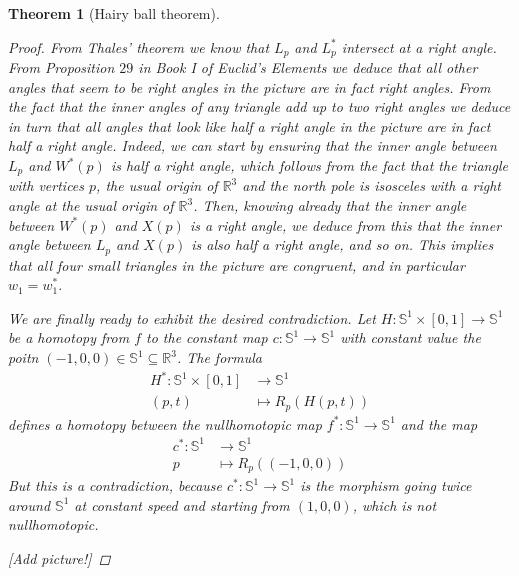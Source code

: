 \documentclass[A4paper, 12pt, british, reqno]{amsart}
\newcommand{\R}{\mathbb{R}} %
\newcommand{\bbS}{\mathbb{S}}
\theoremstyle{plain}
\newtheorem{thm}{Theorem}[section]
\theoremstyle{definition}
\theoremstyle{remark}
\theoremstyle{plain}
\theoremstyle{definition}
\theoremstyle{remark}
\theoremstyle{plain}
\theoremstyle{definition}
\theoremstyle{remark}
\begin{document}
\begin{thm}[Hairy ball theorem]
\begin{proof}
	From Thales' theorem we know that $L_{p}$ and $L^{*}_{p}$ intersect at a right angle.
	From Proposition $29$ in Book I of Euclid's \textit{Elements} we deduce that all other angles that seem to be right angles in the picture are in fact right angles.
	From the fact that the inner angles of any triangle add up to two right angles we deduce in turn that all angles that look like half a right angle in the picture are in fact half a right angle.
	Indeed, we can start by ensuring that the inner angle between $L_{p}$ and $W^{*}(p)$ is half a right angle, which follows from the fact that the triangle with vertices $p$, the usual origin of $\R^{3}$ and the north pole is isosceles with a right angle at the usual origin of $\R^{3}$.
	Then, knowing already that the inner angle between $W^{*}(p)$ and $X(p)$ is a right angle, we deduce from this that the inner angle between $L_{p}$ and $X(p)$ is also half a right angle, and so on.
	This implies that all four small triangles in the picture are congruent, and in particular $w_{1}=w_{1}^{*}$.

	We are finally ready to exhibit the desired contradiction.
	Let $H\colon \bbS^{1}\times [0,1]\to \bbS^{1}$ be a homotopy from $f$ to the constant map $c\colon \bbS^{1}\to \bbS^{1}$ with constant value the poitn $(-1,0,0)\in \bbS^{1}\subseteq \R^{3}$.
	The formula
	\begin{align*}
	    H^{*}\colon \bbS^{1}\times [0,1] & \longrightarrow \bbS^{1} \\
	    (p,t) & \longmapsto R_{p}(H(p,t))
	\end{align*}
	defines a homotopy between the nullhomotopic map $f^{*}\colon \bbS^{1}\to \bbS^{1}$ and the map
	\begin{align*}
	    c^{*}\colon \bbS^{1} & \longrightarrow \bbS^{1} \\
	    p  & \longmapsto R_{p}((-1,0,0))
	\end{align*}
	But this is a contradiction, because $c^{*}\colon \bbS^{1}\to \bbS^{1}$ is the morphism going twice around $\bbS^{1}$ at constant speed and starting from $(1,0,0)$, which is not nullhomotopic.

	{\color{red}[Add picture!]}
    \end{proof}
\end{thm}
\end{document}
